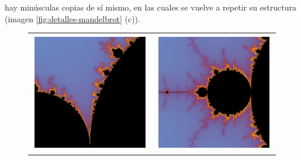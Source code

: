 hay minúsculas copias de sí mismo, en las cuales se vuelve a repetir su estructura (imagen \ref{fig:detalles-mandelbrot} (c)).

\begin{figure}[ht]
  \centering
  \begin{tabular}{cc}
    \includegraphics[scale=0.4]{./img/C3/mandelbrot-autosimilar-1.png} &   \includegraphics[scale=0.4]{./img/C3/mandelbrot-autosimilar-2.png} \\

\end{tabular}
\end{figure}
